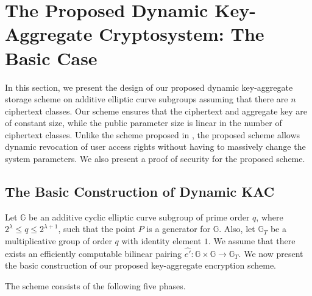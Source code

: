 \section{The Proposed Dynamic Key-Aggregate Cryptosystem: The Basic Case}
\label{sec:proposal}

In this section, we present the design of our proposed dynamic key-aggregate storage scheme on additive elliptic curve subgroups assuming that there are $n$ ciphertext classes. Our scheme ensures that the ciphertext and aggregate key are of constant size, while the public parameter size is linear in the number of ciphertext classes. Unlike the scheme proposed in \cite{chu2014key}, the proposed scheme allows dynamic revocation of user access rights without having to massively change the system parameters. We also present a proof of security for the proposed scheme.

\subsection{The Basic Construction of Dynamic KAC}
\label{subsec:construction1}

Let $\mathbb{G}$ be an additive cyclic elliptic curve subgroup of prime order $q$, where $2^{\lambda}\leq q \leq 2^{\lambda + 1}$, such that the point $P$ is a generator for $\mathbb{G}$. Also, let $\mathbb{G}_{T}$ be a multiplicative group of order $q$ with identity element $1$. We assume that there exists an efficiently computable bilinear pairing $\hat{e'}:\mathbb{G} \times \mathbb{G}\longrightarrow\mathbb{G}_T$. We now present the basic construction of our proposed key-aggregate encryption scheme. 

The scheme consists of the following five phases.


